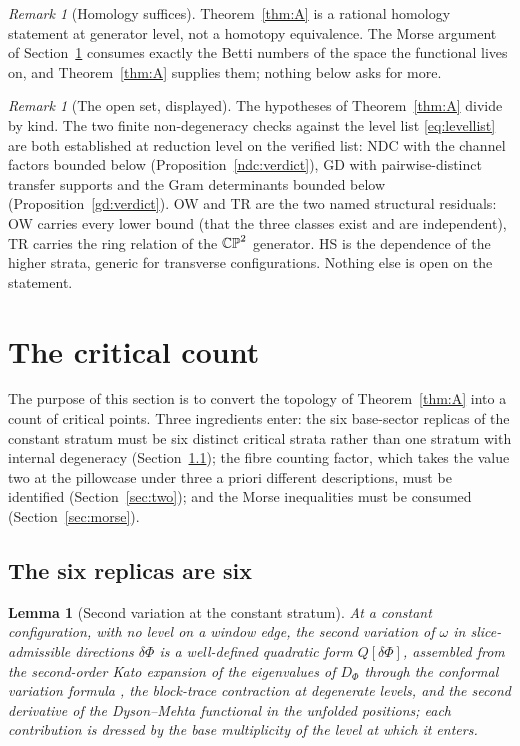 \documentclass[11pt]{article}
\numberwithin{equation}{section}
\theoremstyle{plain}
\newtheorem{lemma}[theorem]{Lemma}
\theoremstyle{definition}
\theoremstyle{remark}
\newtheorem{remark}[theorem]{Remark}
\begin{document}
\begin{remark}[Homology suffices]\label{lp0b:homology}
Theorem~\ref{thm:A} is a rational homology statement at generator
level, not a homotopy equivalence. The Morse argument of
Section~\ref{sec:count} consumes exactly the Betti numbers of the
space the functional lives on, and Theorem~\ref{thm:A} supplies
them; nothing below asks for more.
\end{remark}

\begin{remark}[The open set, displayed]\label{lp0b:open}
The hypotheses of Theorem~\ref{thm:A} divide by kind. The two
finite non-degeneracy checks against the level list
\eqref{eq:levellist} are both established at reduction level on
the verified list: NDC with the channel factors bounded below
(Proposition~\ref{ndc:verdict}), GD with pairwise-distinct
transfer supports and the Gram determinants bounded below
(Proposition~\ref{gd:verdict}). OW and TR are the two named
structural residuals: OW
carries every lower bound (that the three classes exist and are
independent), TR carries the ring relation of the $\mathbb{CP}^2$
generator. HS is the dependence of the higher strata, generic for
transverse configurations. Nothing else is open on the statement.
\end{remark}

\section{The critical count}\label{sec:count}

The purpose of this section is to convert the topology of
Theorem~\ref{thm:A} into a count of critical points. Three
ingredients enter: the six base-sector replicas of the constant
stratum must be six distinct critical strata rather than one
stratum with internal degeneracy (Section~\ref{sec:six}); the fibre
counting factor, which takes the value two at the pillowcase under
three a priori different descriptions, must be identified
(Section~\ref{sec:two}); and the Morse inequalities must be
consumed (Section~\ref{sec:morse}).

\subsection{The six replicas are six}\label{sec:six}

\begin{lemma}[Second variation at the constant
stratum]\label{o3:secondvar}
At a constant configuration, with no level on a window edge, the
second variation of $\omega$ in slice-admissible directions
$\delta\Phi$ is a well-defined quadratic form $Q[\delta\Phi]$,
assembled from the second-order Kato expansion of the eigenvalues
of $D_{\Phi}$ through the conformal variation formula
\cite{Kato, BourguignonGauduchon1992}, the block-trace contraction
at degenerate levels, and the second derivative of the Dyson--Mehta
functional in the unfolded positions; each contribution is dressed
by the base multiplicity of the level at which it enters.
\end{lemma}
\end{document}
